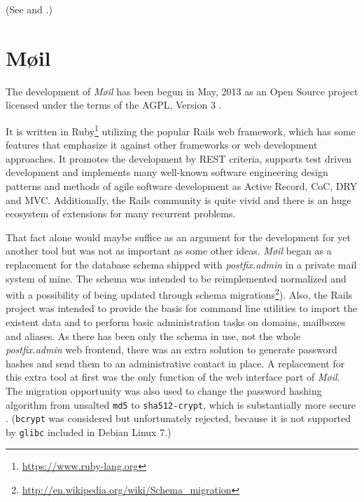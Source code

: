 \documentclass[12pt,a4paper]{scrartcl}
\begin{document}
\begin{landscape}
					(See  and
					.)
			\end{landscape}

	\section*{Møil}
	\label{sec:moeil}
		The development of \emph{Møil} has been begun in May, 2013 as an Open
		Source project licensed under the terms of the AGPL, Version 3
		\cite{agpl}.

		
		It is written in Ruby\footnote{\url{https://www.ruby-lang.org}}
		utilizing the popular \ac{Rails} web framework, which has some features
		that emphasize it against other frameworks or web development
		approaches. It promotes the development by \acs{REST} \cite{rest}
		criteria, supports test driven development and implements many
		well-known software engineering design patterns and methods of agile
		software development as Active Record, \ac{CoC}, \ac{DRY} and \ac{MVC}.
		Additionally, the \ac{Rails} community is quite vivid and there is an
		huge ecosystem of extensions for many recurrent problems.
		\s


		That fact alone would maybe suffice as an argument for the development
		for yet another tool but was not as important as some other ideas.
		\emph{Møil} began as a replacement for the database schema shipped with
		\emph{postfix.admin} in a private mail system of mine. The schema
		was intended to be reimplemented normalized \cite{dbnorm} and with
		a possibility of being updated through schema
		migrations\footnote{\url{http://en.wikipedia.org/wiki/Schema_migration}}).
		Also, the \ac{Rails} project was intended to provide the basis for
		command line utilities to import the existent data and to perform basic
		administration tasks on domains, mailboxes and aliases. As there has
		been only the schema in use, not the whole \emph{postfix.admin} web
		frontend, there was an extra solution to generate password hashes and
		send them to an administrative contact in place. A replacement for this
		extra tool at first was the only function of the web interface part of
		\emph{Møil}. The migration opportunity was also used to change the
		password hashing algorithm from unsalted \texttt{md5} to
		\texttt{sha512-crypt}, which is substantially more secure
		\cite{missing}. (\texttt{bcrypt} was considered but unfortunately
		rejected, because it is not supported by \texttt{glibc} included in
		Debian Linux 7.)
\end{document}

